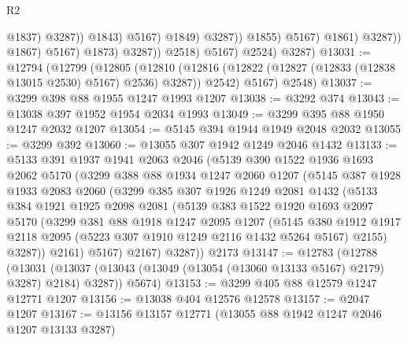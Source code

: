 \begin{lexlean}{R2}
\begin{coremodule}
                                                @1837)
                                              @3287))
                                          @1843)
                                        @5167)
                                      @1849)
                                    @3287))
                                @1855)
                              @5167)
                            @1861)
                          @3287))
                      @1867)
                    @5167)
                  @1873)
                @3287))
            @2518)
          @5167)
        @2524)
      @3287)
@13031 := @12794
    (@12799
      (@12805
        (@12810 (@12816 (@12822 (@12827 (@12833 (@12838 @13015 @2530) @5167) @2536) @3287)) @2542)
        @5167)
      @2548)
@13037 := @3299 @398 @88 @1955 @1247 @1993 @1207
@13038 := @3292 @374
@13043 := @13038 @397 @1952 @1954 @2034 @1993
@13049 := @3299 @395 @88 @1950 @1247 @2032 @1207
@13054 := @5145 @394 @1944 @1949 @2048 @2032
@13055 := @3299 @392
@13060 := @13055 @307 @1942 @1249 @2046 @1432
@13133 := @5133
    @391
    @1937
    @1941
    @2063
    @2046
    (@5139
      @390
      @1522
      @1936
      @1693
      @2062
      @5170
      (@3299
        @388
        @88
        @1934
        @1247
        @2060
        @1207
        (@5145
          @387
          @1928
          @1933
          @2083
          @2060
          (@3299
            @385
            @307
            @1926
            @1249
            @2081
            @1432
            (@5133
              @384
              @1921
              @1925
              @2098
              @2081
              (@5139
                @383
                @1522
                @1920
                @1693
                @2097
                @5170
                (@3299
                  @381
                  @88
                  @1918
                  @1247
                  @2095
                  @1207
                  (@5145
                    @380
                    @1912
                    @1917
                    @2118
                    @2095
                    (@5223 @307 @1910 @1249 @2116 @1432 @5264 @5167)
                    @2155)
                  @3287))
              @2161)
            @5167)
          @2167)
        @3287))
    @2173
@13147 := @12783
    (@12788
      (@13031 (@13037 (@13043 (@13049 (@13054 (@13060 @13133 @5167) @2179) @3287) @2184) @3287))
      @5674)
@13153 := @3299 @405 @88 @12579 @1247 @12771 @1207
@13156 := @13038 @404 @12576 @12578
@13157 := @2047 @1207
@13167 := @13156 @13157 @12771 (@13055 @88 @1942 @1247 @2046 @1207 @13133 @3287)

\end{coremodule}
\end{lexlean}
